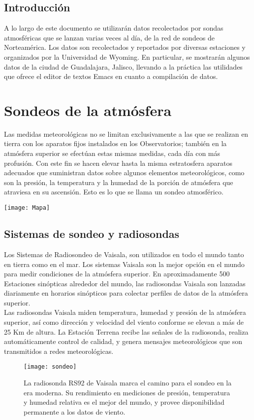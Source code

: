 \documentclass[12pt]{article}
\begin{document}
\begin{centering}
\section*{Introducción}
\end{centering}

A lo largo de este documento se utilizarán datos recolectados por sondas atmosféricas que se lanzan varias veces al día, de la red de sondeos de Norteamérica. Los datos son recolectados y reportados por diversas estaciones y organizados por la Universidad de Wyoming. En particular, se mostrarán algunos datos de la ciudad de Guadalajara, Jalisco, llevando a la práctica las utilidades que ofrece el editor de textos Emacs en cuanto a compilación de datos.

\section{Sondeos de la atmósfera}
Las medidas meteorológicas no se limitan exclusivamente a  las que se realizan en  tierra con los aparatos fijos instalados en los Observatorios; también en la atmósfera superior se efectúan estas mismas medidas, cada día con más profusión. Con este fin se hacen elevar hasta la misma estratosfera aparatos adecuados que suministran datos sobre algunos elementos meteorológicos, como son la presión, la temperatura y la humedad de la porción de atmósfera que atraviesa en su ascensión. Esto es lo que se llama un sondeo atmosférico. 
\begin{center}
\texttt{[image: Mapa]}
\end{center}

\newpage
\subsection{Sistemas de sondeo y radiosondas}
Los Sistemas de Radiosondeo de Vaisala, son utilizados en todo el mundo tanto en tierra como en el mar. Los sistemas Vaisala son la mejor opción en el mundo para medir condiciones de la atmósfera superior. En aproximadamente 500 Estaciones sinópticas alrededor del mundo, las radiosondas Vaisala son lanzadas diariamente en horarios sinópticos para colectar perfiles de datos de la atmósfera superior. \\
Las radiosondas Vaisala miden temperatura, humedad y presión de la atmósfera superior, así como dirección y velocidad del viento conforme se elevan a más de 25 Km de altura. La Estación Terrena recibe las señales de la radiosonda, realiza automáticamente control de calidad, y genera mensajes meteorológicos que son transmitidos a redes meteorológicas.
\vspace{1cm}
\begin{SCfigure}[0.5][h]
\caption{La radiosonda RS92 de Vaisala marca el camino para el sondeo en la era moderna. Su rendimiento en mediciones de presión, temperatura y humedad relativa es el mejor del mundo, y provee disponibilidad permanente a los datos de viento. }
\texttt{[image: sondeo]}
\end{SCfigure}
\end{document}
